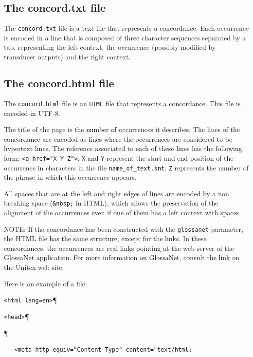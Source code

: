 \subsection{The concord.txt file}
The \verb+concord.txt+ file is a text file that represents a concordance. Each
occurrence is encoded in a line that is composed of three character sequences
separated by a tab, representing the left context, the occurrence (possibly
modified by transducer outputs) and the right context.


\subsection{The concord.html file}
The \verb+concord.html+ file is an \verb+HTML+ file that represents a
concordance. This file is encoded in UTF-8.

\bigskip
\noindent The title of the page is the number of occurrences it describes. The
lines of the concordance are encoded as lines where the occurrences are
considered to be hypertext lines. The reference associated to each of these lines
has the following form: \verb+<a href="X Y Z">+. \verb+X+ and \verb+Y+ represent
the start and end position of the occurrence in characters in the file
\verb+name_of_text.snt+. \verb+Z+ represents the number of the phrase in which
this occurrence appears.

\bigskip
\noindent All spaces that are at the left and right edges of lines are encoded by
a non breaking space (\verb+&nbsp;+ in HTML), which allows the preservation of
the alignment of the occurrences even if one of them has a left context with
spaces.

\bigskip
\noindent NOTE: If the concordance has been constructed with the \verb+glossanet+
parameter, the HTML file has the same structure, except for the links. In
these concordances, the occurrences are real links pointing at the web server of
the GlossaNet application. For more information on GlossaNet, consult the link on
the Unitex web site. 

\bigskip
\noindent Here is an example of a file:

\bigskip

\verb$<html lang=en>$\P

\verb$<head>$\P

\verb$$\P

\verb$   <meta http-equiv="Content-Type" content="text/html;$

